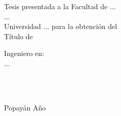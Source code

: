
\vspace{4cm}


\vspace{4cm}

Tesis presentada a la Facultad de ... \\
... \\
Universidad ... para la obtención del \\
Título de \\

\vspace{1cm}

Ingeniero en: \\
...

\vspace{1cm}

 \\
 \\

\vspace{2cm}

Popayán
Año